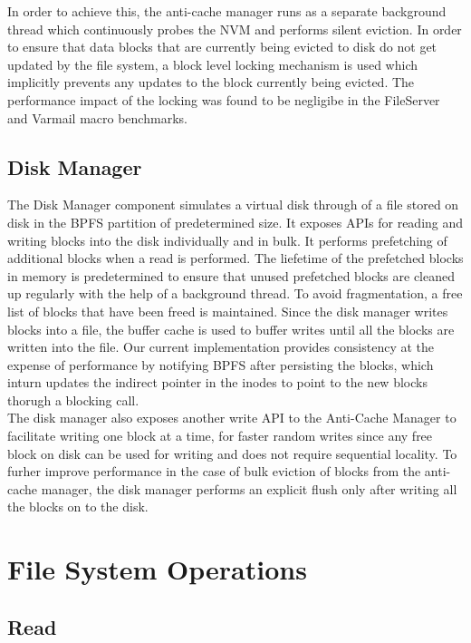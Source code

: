 \documentclass[letterpaper, 10 pt, conference]{ieeeconf}  %
\begin{document}
In order to achieve this, the anti-cache manager runs as a separate background thread which continuously probes the NVM and performs silent eviction. In order to ensure that data blocks that are currently being evicted to disk do not get updated by the file system, a block level locking mechanism is used which implicitly prevents any updates to the block currently being evicted. The performance impact of the locking was found to be negligibe in the FileServer and Varmail macro benchmarks. 


\subsection{Disk Manager}

The Disk Manager component simulates a virtual disk through of a file stored on disk in the BPFS partition of predetermined size. It exposes APIs for reading and writing blocks into the disk individually and in bulk. It performs prefetching of additional blocks when a read is performed. The liefetime of the prefetched blocks in memory is predetermined to ensure that unused prefetched blocks are cleaned up regularly with the help of a background thread. To avoid fragmentation, a free list of blocks that have been freed is maintained. Since the disk manager writes blocks into a file, the buffer cache is used to buffer writes until all the blocks are written into the file. Our current implementation provides consistency at the expense of performance by notifying BPFS after persisting the blocks, which inturn updates the indirect pointer in the inodes to point to the new blocks thorugh a blocking call. \\

The disk manager also exposes another write API to the Anti-Cache Manager to facilitate writing one block at a time, for faster random writes since any free block on disk can be used for writing and does not require sequential locality. To furher improve performance in the case of bulk eviction of blocks from the anti-cache manager, the disk manager performs an explicit flush only after writing all the blocks on to the disk.\\

\section{File System Operations}

\subsection{Read}
\end{document}
